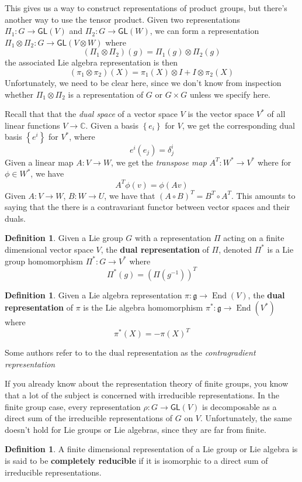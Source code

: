 \documentclass[psamsfonts]{amsart}
\theoremstyle{definition}
\newtheorem{defn}[thm]{Definition}
\theoremstyle{remark}
\newcommand{\C}{\mathbb{C}}
\newcommand{\GL}{\mathsf{GL}}
\newcommand{\g}{\mathfrak{g}}
\newcommand{\inv}{^{-1}}
\newcommand{\set}[1]{\left\lbrace#1 \right\rbrace}
\DeclareMathOperator{\End}{End}
\begin{document}
This gives us a way to construct representations of product groups, but there's another way to use the tensor product. Given two representations $\Pi_1: G \to \GL(V)$ and $\Pi_2: G \to \GL(W)$, we can form a representation $\Pi_1 \otimes \Pi_2: G \to \GL(V\otimes W)$ where
$$(\Pi_1\otimes \Pi_2)(g) = \Pi_1(g) \otimes \Pi_2(g) $$
the associated Lie algebra representation is then
$$(\pi_1\otimes \pi_2)(X) = \pi_1(X) \otimes I + I \otimes \pi_2(X) $$
Unfortunately, we need to be clear here, since we don't know from inspection whether $\Pi_1 \otimes \Pi_2$ is a representation of $G$ or $G\times G$ unless we specify here.

Recall that that the \emph{dual space} of a vector space $V$ is the vector space $V^*$ of all linear functions $V \to \C$. Given a basis $\set{e_i}$ for $V$, we get the corresponding dual basis $\set{e^i}$ for $V^*$, where 
$$e^i(e_j) = \delta^i_j $$
Given a linear map $A: V \to W$, we get the \emph{transpose map} $A^T: W^* \to V^*$ where for $\phi \in W^*$, we have
$$A^T\phi(v) = \phi(Av) $$
Given $A: V \to W$, $B: W \to U$, we have that $(A \circ B)^T = B^T \circ A^T$. This amounts to saying that the there is a contravariant functor between vector spaces and their duals.

\begin{defn}
Given a Lie group $G$ with a representation $\Pi$ acting on a finite dimensional vector space $V$, the \textbf{dual representation} of $\Pi$, denoted $\Pi^*$ is a Lie group homomorphism $\Pi^*: G \to V^*$ where
$$\Pi^*(g) = \left( \Pi(g\inv)\right)^T $$
\end{defn}

\begin{defn}
Given a Lie algebra representation $\pi: \g \to \End(V)$, the \textbf{dual representation} of $\pi$ is the Lie algebra homomorphism $\pi^*: \g \to \End(V^*)$ where
$$\pi^*(X) = -\pi(X)^T $$
\end{defn}
Some authors refer to to the dual representation as the \emph{contragradient representation}

If you already know about the representation theory of finite groups, you know that a lot of the subject is concerned with irreducible representations. In the finite group case, every representation $\rho:G \to \GL(V)$ is decomposable as a direct sum of the irreducible representations of $G$ on $V$. Unfortunately, the same doesn't hold for Lie groups or Lie algebras, since they are far from finite.
\begin{defn}
A finite dimensional representation of a Lie group or Lie algebra is is said to be \textbf{completely reducible} if it is isomorphic to a direct sum of irreducible representations.
\end{defn}
\end{document}
